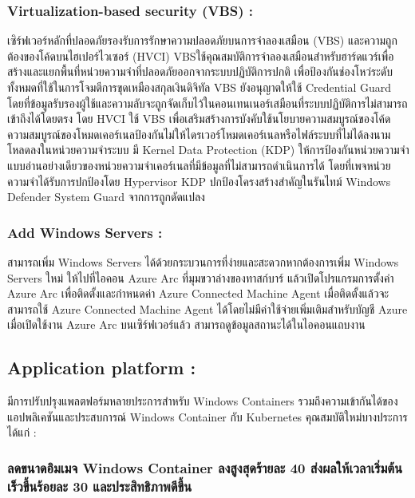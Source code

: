 \hspace{1cm}\subsubsection{Virtualization-based security (VBS) :}เซิร์ฟเวอร์หลักที่ปลอดภัยรองรับการรักษาความปลอดภัยบนการจำลองเสมือน (VBS) และความถูกต้องของโค้ดบนไฮเปอร์ไวเซอร์ (HVCI) VBSใช้คุณสมบัติการจำลองเสมือนสำหรับฮาร์ดแวร์เพื่อสร้างและแยกพื้นที่หน่วยความจำที่ปลอดภัยออกจากระบบปฏิบัติการปกติ เพื่อป้องกันช่องโหว่ระดับทั้งหมดที่ใช้ในการโจมตีการขุดเหมืองสกุลเงินดิจิทัล VBS ยังอนุญาตให้ใช้ Credential Guard โดยที่ข้อมูลรับรองผู้ใช้และความลับจะถูกจัดเก็บไว้ในคอนเทนเนอร์เสมือนที่ระบบปฏิบัติการไม่สามารถเข้าถึงได้โดยตรง โดย HVCI ใช้ VBS เพื่อเสริมสร้างการบังคับใช้นโยบายความสมบูรณ์ของโค้ด ความสมบูรณ์ของโหมดเคอร์เนลป้องกันไม่ให้ไดรเวอร์โหมดเคอร์เนลหรือไฟล์ระบบที่ไม่ได้ลงนามโหลดลงในหน่วยความจำระบบ มี Kernel Data Protection (KDP) ให้การป้องกันหน่วยความจำแบบอ่านอย่างเดียวของหน่วยความจำเคอร์เนลที่มีข้อมูลที่ไม่สามารถดำเนินการได้ โดยที่เพจหน่วยความจำได้รับการปกป้องโดย Hypervisor KDP ปกป้องโครงสร้างสำคัญในรันไทม์ Windows Defender System Guard จากการถูกดัดแปลง  

\hspace{1cm}\subsubsection{Add Windows Servers :}สามารถเพิ่ม Windows Servers ได้ด้วยกระบวนการที่ง่ายและสะดวกหากต้องการเพิ่ม Windows Servers ใหม่ ให้ไปที่ไอคอน Azure Arc ที่มุมขวาล่างของทาสก์บาร์ แล้วเปิดโปรแกรมการตั้งค่า Azure Arc เพื่อติดตั้งและกำหนดค่า Azure Connected Machine Agent เมื่อติดตั้งแล้วจะสามารถใช้ Azure Connected Machine Agent ได้โดยไม่มีค่าใช้จ่ายเพิ่มเติมสำหรับบัญชี Azure เมื่อเปิดใช้งาน Azure Arc บนเซิร์ฟเวอร์แล้ว สามารถดูข้อมูลสถานะได้ในไอคอนแถบงาน 

\clearpage

\hspace{0cm}\subsection{Application platform :}มีการปรับปรุงแพลตฟอร์มหลายประการสำหรับ Windows Containers รวมถึงความเข้ากันได้ของแอปพลิเคชันและประสบการณ์ Windows Container กับ Kubernetes  คุณสมบัติใหม่บางประการ ได้แก่ : 

\hspace{1cm}\subsubsection{ลดขนาดอิมเมจ Windows Container ลงสูงสุดร้ายละ 40 ส่งผลให้เวลาเริ่มต้นเร็วขึ้นร้อยละ 30 และประสิทธิภาพดีขึ้น}

